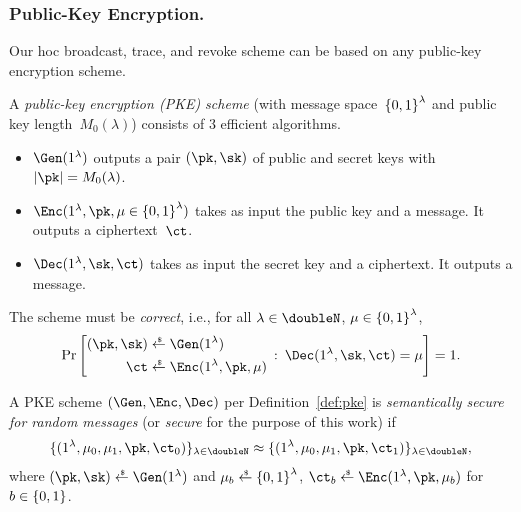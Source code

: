 \subsubsection{Public-Key Encryption.}
Our \ad hoc broadcast, trace, and revoke scheme can be based on any public-key encryption scheme.

\begin{definition}[PKE]\label{def:pke}
A \emph{public-key encryption (PKE) scheme} (with message space~${\{0,1\}}^\lambda$ and public key length~$M_0(\lambda)$)
consists of 3 efficient algorithms.
\begin{itemize}
\item $\Gen(1^\lambda)$ outputs a pair $(\pk,\sk)$ of public and secret keys
with ${|\pk|=M_0(\lambda)}$.
\item ${\Enc(1^\lambda,\pk,\mu\in\bit^\lambda)}$ takes as input the public key and a message.
It outputs a ciphertext~$\ct$.
\item $\Dec(1^\lambda,\sk,\ct)$ takes as input the secret key and a ciphertext.
It outputs a message.
\end{itemize}
The scheme must be \emph{correct}, i.e., for all
${\lambda\in\doubleN}$,
${\mu\in{\{0,1\}}^\lambda}$,
\begin{align*}
\Pr\left[
\begin{aligned}
(\pk,\sk)&{}\draws\Gen(1^\lambda)\\
\ct&{}\draws\Enc(1^\lambda,\pk,\mu)
\end{aligned}
\::\:
\Dec(1^\lambda,\sk,\ct)=\mu
\right]=1.
\end{align*}
\end{definition}

\begin{definition}\label{def:pke-security}
A PKE scheme $(\Gen,\Enc,\Dec)$ per Definition~\ref{def:pke} is \emph{semantically secure for random messages} (or \emph{secure} for the purpose of this work) if
\begin{align*}
\{(1^\lambda,\mu_0,\mu_1,\pk,\ct_0)\}_{\lambda\in\doubleN}
\approx
\{(1^\lambda,\mu_0,\mu_1,\pk,\ct_1)\}_{\lambda\in\doubleN},
\end{align*}
where $(\pk,\sk)\draws\Gen(1^\lambda)$ and
${\mu_b\draws\bit^\lambda}$, ${\ct_b\draws\Enc(1^\lambda,\pk,\mu_b)}$ for~${b\in{\{0,1\}}}$.
\end{definition}
